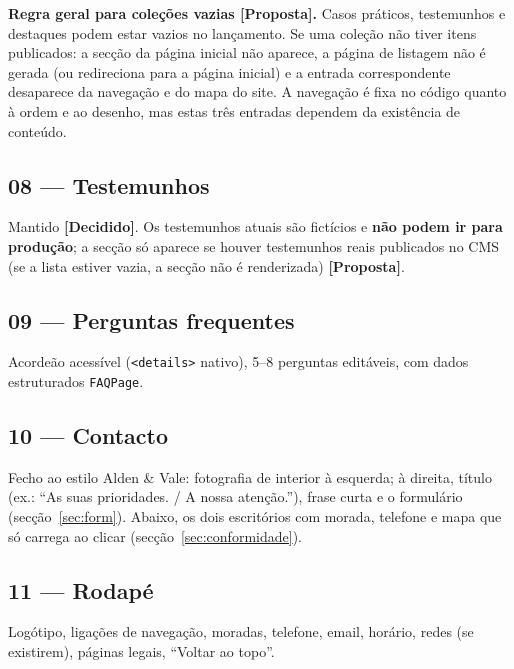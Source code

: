 \documentclass[11pt,a4paper]{article}
\newcommand{\decidido}{\textcolor{verde700}{\textbf{[Decidido]}}}
\newcommand{\proposta}{\textcolor{bronze}{\textbf{[Proposta]}}}
\begin{document}
\textbf{Regra geral para coleções vazias \proposta.} Casos práticos, testemunhos e destaques podem estar vazios no lançamento. Se uma coleção não tiver itens publicados: a secção da página inicial não aparece, a página de listagem não é gerada (ou redireciona para a página inicial) e a entrada correspondente desaparece da navegação e do mapa do site. A navegação é fixa no código quanto à ordem e ao desenho, mas estas três entradas dependem da existência de conteúdo.

\subsection*{08 --- Testemunhos}
Mantido \decidido. Os testemunhos atuais são fictícios e \textbf{não podem ir para produção}; a secção só aparece se houver testemunhos reais publicados no CMS (se a lista estiver vazia, a secção não é renderizada) \proposta.

\subsection*{09 --- Perguntas frequentes}
Acordeão acessível (\texttt{<details>} nativo), 5--8 perguntas editáveis, com dados estruturados \texttt{FAQPage}.

\subsection*{10 --- Contacto}
Fecho ao estilo Alden \& Vale: fotografia de interior à esquerda; à direita, título (ex.: ``As suas prioridades. / A nossa atenção.''), frase curta e o formulário (secção~\ref{sec:form}). Abaixo, os dois escritórios com morada, telefone e mapa que só carrega ao clicar (secção~\ref{sec:conformidade}).

\subsection*{11 --- Rodapé}
Logótipo, ligações de navegação, moradas, telefone, email, horário, redes (se existirem), páginas legais, ``Voltar ao topo''.

\end{document}
